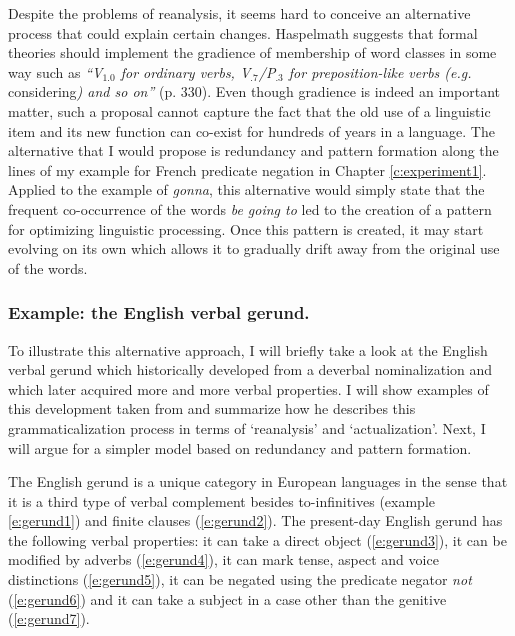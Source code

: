 Despite the problems of reanalysis, it seems hard to conceive an alternative process that could explain certain changes. Haspelmath suggests that formal theories should implement the gradience of membership of word classes in some way such as {\em ``V$_{1.0}$ for ordinary verbs, V$_{.7}$/P$_{.3}$ for preposition-like verbs (e.g.} considering{\em) and so on''} (p. 330). Even though gradience is indeed an important matter, such a proposal cannot capture the fact that the old use of a linguistic item and its new function can co-exist for hundreds of years in a language. The alternative that I would propose is  redundancy and pattern formation along the lines of my example for French predicate negation in Chapter \ref{c:experiment1}. Applied to the example of {\em gonna}, this alternative would simply state that the frequent co-occurrence of the words {\em be going to} led to the creation of a pattern for optimizing linguistic processing. Once this pattern is created, it may start evolving on its own which allows it to gradually drift away from the original use of the words.


\subsubsection{Example: the English verbal gerund.} 
To illustrate this alternative approach, I will briefly take a look at the English verbal gerund which historically developed from a deverbal nominalization and which later acquired more and more verbal properties. I will show examples of this development taken from \citet{fanego04reanalysis} and summarize how he describes this grammaticalization process in terms of `reanalysis' and `actualization'. Next, I will argue for a simpler model based on  redundancy and pattern formation.

The English gerund is a unique category in European languages in the sense that it is a third type of verbal complement besides  to-infinitives (example \ref{e:gerund1}) and finite clauses (\ref{e:gerund2}). The present-day English gerund has the following verbal properties: it can take a direct object (\ref{e:gerund3}), it can be modified by adverbs (\ref{e:gerund4}), it can mark tense, aspect and voice distinctions (\ref{e:gerund5}), it can be negated using the predicate negator {\em not} (\ref{e:gerund6}) and it can take a subject in a case other than the genitive (\ref{e:gerund7}).

